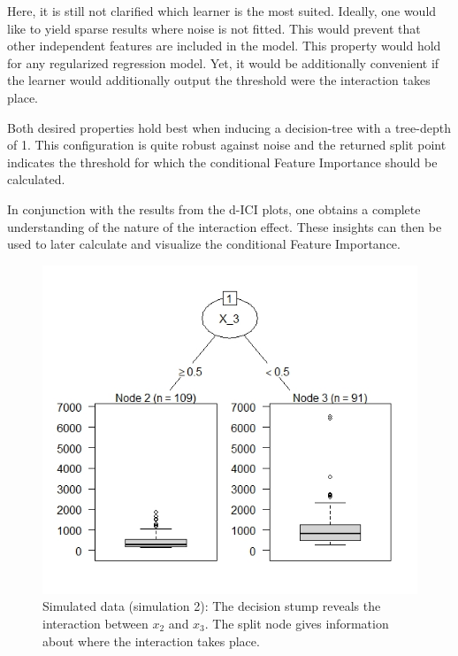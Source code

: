 \documentclass[]{krantz}
\begin{document}
Here, it is still not clarified which learner is the most suited.
Ideally, one would like to yield sparse results where noise is not
fitted. This would prevent that other independent features are included
in the model. This property would hold for any regularized regression
model. Yet, it would be additionally convenient if the learner would
additionally output the threshold were the interaction takes place.

Both desired properties hold best when inducing a decision-tree with a
tree-depth of 1. This configuration is quite robust against noise and
the returned split point indicates the threshold for which the
conditional Feature Importance should be calculated.

In conjunction with the results from the d-ICI plots, one obtains a
complete understanding of the nature of the interaction effect. These
insights can then be used to later calculate and visualize the
conditional Feature Importance.

\begin{figure}

{\centering \includegraphics[width=0.99\linewidth]{images/03-7-5} 

}

\caption{Simulated data (simulation 2): The decision stump reveals the interaction between $x_{2}$ and $x_{3}$. The split node gives information about where the interaction takes place.}\label{fig:fig5}
\end{figure}
\end{document}
